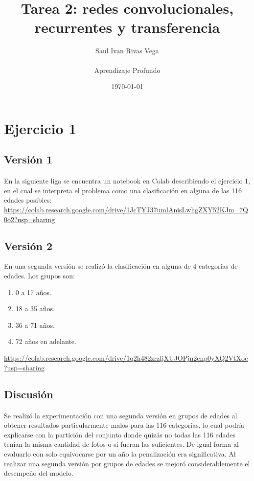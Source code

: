 \documentclass[12pt]{article}
\title{Tarea 2: redes convolucionales, recurrentes y transferencia}
\author{
	Saul Ivan Rivas Vega \\
	\\
	Aprendizaje Profundo\\
}
\date{\today}
\begin{document}
	\maketitle
	\pagebreak
	\section{Ejercicio 1}
		\subsection{Versión 1}
	  \paragraph{} En la siguiente liga se encuentra un notebook en Colab describiendo el ejercicio 1, en el cual se interpreta el problema como una clasificación en alguna de las 116 edades posibles:\\
	  \url{https://colab.research.google.com/drive/1JcTYJ37umlAnisLwhgZXY52KJm_7Q0o2?usp=sharing}\\
	  
		\subsection{Versión 2}
	  En una segunda versión se realizó la clasificación en alguna de 4 categorías de edades. Los grupos son:
	  \begin{enumerate}
	  	\item  0 a 17 años.
	  	\item 18 a 35 años.
	  	\item 36 a 71 años.
	  	\item 72 años en adelante.
	  \end{enumerate}
	   \url{https://colab.research.google.com/drive/1q2h482zrzljXUJOPjn2cnp0yXQ2VtXoc?usp=sharing}\\
	  \subsection{Discusión}
	  \paragraph{} Se realizó la experimentación con una segunda versión en grupos de edades al obtener resultados particularmente malos para las 116 categorías, lo cual podría explicarse con la partición del conjunto donde quizás no todas las 116 edades tenían la misma cantidad de fotos o si fueran las suficientes. De igual forma al evaluarlo con solo equivocarse por un año la penalización era significativa. Al realizar una segunda versión por grupos de edades se mejoró considerablemente el desempeño del modelo.
\end{document}
